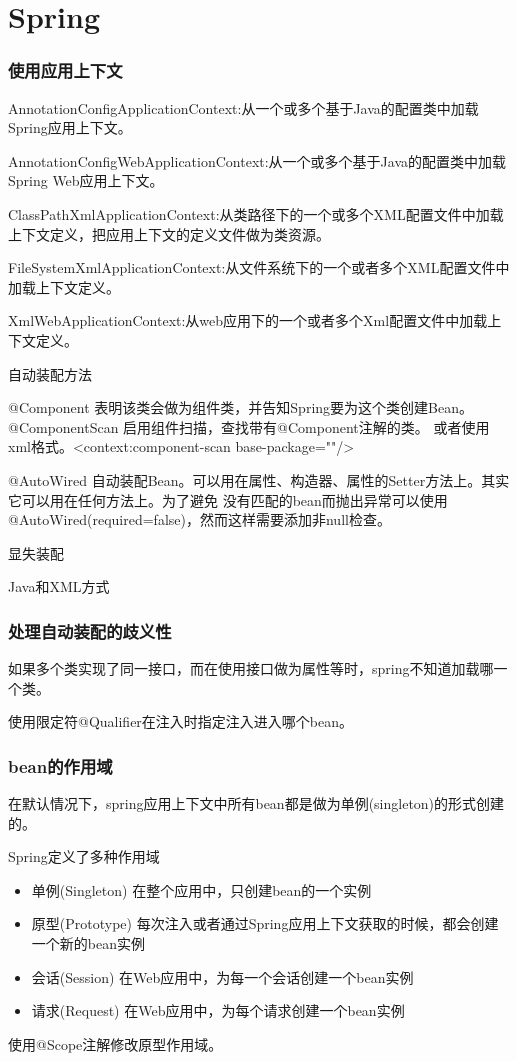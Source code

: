 \chapter{Spring}

\subsection{使用应用上下文}

AnnotationConfigApplicationContext:从一个或多个基于Java的配置类中加载Spring应用上下文。

AnnotationConfigWebApplicationContext:从一个或多个基于Java的配置类中加载Spring Web应用上下文。

ClassPathXmlApplicationContext:从类路径下的一个或多个XML配置文件中加载上下文定义，把应用上下文的定义文件做为类资源。

FileSystemXmlApplicationContext:从文件系统下的一个或者多个XML配置文件中加载上下文定义。

XmlWebApplicationContext:从web应用下的一个或者多个Xml配置文件中加载上下文定义。


自动装配方法

@Component 表明该类会做为组件类，并告知Spring要为这个类创建Bean。
@ComponentScan 启用组件扫描，查找带有@Component注解的类。
或者使用xml格式。<context:component-scan base-package=""/>

@AutoWired 自动装配Bean。可以用在属性、构造器、属性的Setter方法上。其实它可以用在任何方法上。为了避免
没有匹配的bean而抛出异常可以使用@AutoWired(required=false)，然而这样需要添加非null检查。

显失装配

Java和XML方式


\subsection{处理自动装配的歧义性}
如果多个类实现了同一接口，而在使用接口做为属性等时，spring不知道加载哪一个类。

使用限定符@Qualifier在注入时指定注入进入哪个bean。


\subsection{bean的作用域}

在默认情况下，spring应用上下文中所有bean都是做为单例(singleton)的形式创建的。

Spring定义了多种作用域

\begin{itemize}
    \item 单例(Singleton)   在整个应用中，只创建bean的一个实例
    \item 原型(Prototype)   每次注入或者通过Spring应用上下文获取的时候，都会创建一个新的bean实例
    \item 会话(Session)     在Web应用中，为每一个会话创建一个bean实例
    \item 请求(Request)     在Web应用中，为每个请求创建一个bean实例
\end{itemize}

使用@Scope注解修改原型作用域。






